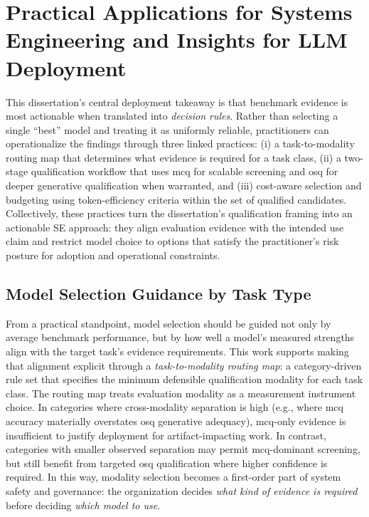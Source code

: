 \section{Practical Applications for Systems Engineering and Insights for LLM Deployment}\label{sec:practical_applications}

This dissertation’s central deployment takeaway is that benchmark evidence is most actionable when translated into \emph{decision rules}. Rather than selecting a single ``best'' model and treating it as uniformly reliable, practitioners can operationalize the findings through three linked practices: (i) a task-to-modality routing map that determines what evidence is required for a task class, (ii) a two-stage qualification workflow that uses \ac{mcq} for scalable screening and \ac{osq} for deeper generative qualification when warranted, and (iii) cost-aware selection and budgeting using token-efficiency criteria within the set of qualified candidates. Collectively, these practices turn the dissertation’s qualification framing into an actionable SE approach: they align evaluation evidence with the intended use claim and restrict model choice to options that satisfy the practitioner's risk posture for adoption and operational constraints. 

\subsection{Model Selection Guidance by Task Type}

From a practical standpoint, model selection should be guided not only by average benchmark performance, but by how well a model’s measured strengths align with the target task’s evidence requirements. This work supports making that alignment explicit through a \emph{task-to-modality routing map}: a category-driven rule set that specifies the minimum defensible qualification modality for each task class. The routing map treats evaluation modality as a measurement instrument choice. In categories where cross-modality separation is high (e.g., where \ac{mcq} accuracy materially overstates \ac{osq} generative adequacy), \ac{mcq}-only evidence is insufficient to justify deployment for artifact-impacting work. In contrast, categories with smaller observed separation may permit \ac{mcq}-dominant screening, but still benefit from targeted \ac{osq} qualification where higher confidence is required. In this way, modality selection becomes a first-order part of system safety and governance: the organization decides \emph{what kind of evidence is required} before deciding \emph{which model to use}.

